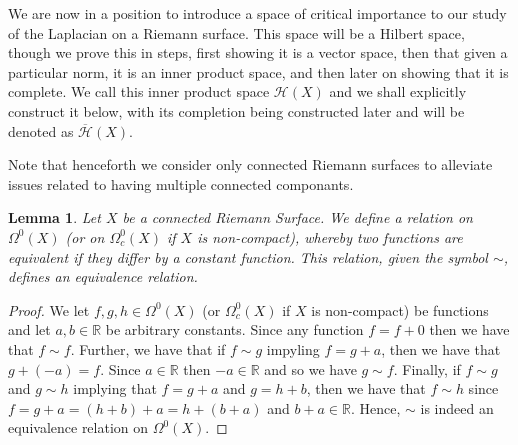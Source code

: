 \documentclass[11pt]{report}
\newtheorem{lemma}[thm]{Lemma}
\theoremstyle{definition}
\newtheorem{defn}[thm]{Definition}
\begin{document}
We are now in a position to introduce a space of critical importance to our study of the Laplacian on a Riemann surface. This space will be a Hilbert space, though we prove this in steps, first showing it is a vector space, then that given a particular norm, it is an inner product space, and then later on showing that it is complete. We call this inner product space $\mathcal{H}(X)$ and we shall explicitly construct it below, with its completion being constructed later and will be denoted as $\overline{\mathcal{H}}(X)$. 

Note that henceforth we consider only connected Riemann surfaces to alleviate  issues related to having multiple connected componants.





\begin{lemma}
  Let $X$ be a connected Riemann Surface. We define a relation on $\Omega^0(X)$ (or on $\Omega^0_c(X)$ if $X$ is non-compact), whereby two functions are equivalent if they differ by a constant function. This relation, given the symbol $\sim$, defines an equivalence relation.
\end{lemma}

\begin{proof}
  We let $f,g,h \in \Omega^0(X)$ (or $\Omega^0_c(X)$ if $X$ is non-compact) be functions and let $a, b \in \mathbb{R}$ be arbitrary constants. 
  Since any function $f = f + 0$ then we have that $f \sim f$. 
  Further, we have that if $f \sim g$ impyling $f = g + a$, then we have that $g + (-a) = f$. Since $a \in \mathbb{R}$ then $-a \in \mathbb{R}$ and so we have $g \sim f$. 
  Finally, if $f \sim g$ and $g \sim h$ implying that $f = g + a$ and $g = h + b$, then we have that $f \sim h$ since $f = g + a = (h + b) + a = h + (b + a)$ and $b+a \in \mathbb{R}$. Hence, $\sim$ is indeed an equivalence relation on $\Omega^0(X)$. 
\end{proof}
\end{document}
